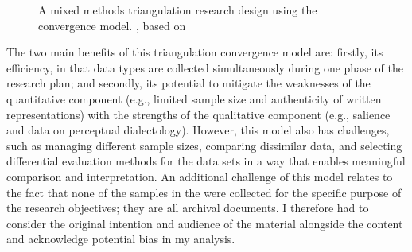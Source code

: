 \begin{figure} 
\small
{}


\caption{\label{fig:key:1.1} A mixed methods triangulation research design using the convergence model.
, based on \citealt{CreswellPlanoClark2007}
}
\end{figure}



The two main benefits of this triangulation convergence model are: firstly, its efficiency, in that data types are collected simultaneously during one phase of the research plan; and secondly, its potential to mitigate the weaknesses of the quantitative component (e.g., limited sample size and authenticity of written representations) with the strengths of the qualitative component (e.g., salience and data on perceptual dialectology). However, this model also has challenges, such as managing different sample sizes, comparing dissimilar data, and selecting differential evaluation methods for the data sets in a way that enables meaningful comparison and interpretation. An additional challenge of this model relates to the fact that none of the samples in the  were collected for the specific purpose of the research objectives; they are all archival documents. I therefore had to consider the original intention and audience of the material alongside the content and acknowledge potential bias in my analysis. 



